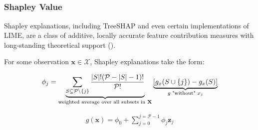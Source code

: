 \documentclass[11pt,aspectratio=169,hyperref={colorlinks}]{beamer}
\begin{document}
	\subsection*{} %


	\begin{frame}
	
		\frametitle{Shapley Value}	
	
		Shapley explanations, including TreeSHAP and even certain implementations of LIME, are a class of additive, locally accurate feature contribution measures with long-standing theoretical support (\cite{shapley}). 
	
		\vspace{8pt}
	
		For some observation $\mathbf{x} \in \mathcal{X}$, Shapley explanations take the form:
	
		\begin{equation}
		\label{eq:shap_contrib}
		\begin{aligned}
		\phi_{j} = \underbrace{\sum_{S \subseteq \mathcal{P} \setminus \{j\}}\frac{|S|!(\mathcal{P} -|S| -1)!}{\mathcal{P}!}}_\text{weighted average over all subsets in \textbf{X}}\underbrace{[g_x(S \cup \{j\}) - g_x(S)]}_{g\text{ "without" }x_j}
		\end{aligned}
		\end{equation}
		
		\begin{equation}
		\label{eq:shap_additive}
		\begin{aligned}
		g(\mathbf{x}) = \phi_0 + \sum_{j=0}^{j=\mathcal{P} - 1} \phi_j \mathbf{z}_j
		\end{aligned}
		\end{equation}
	
	\end{frame}
\end{document}
